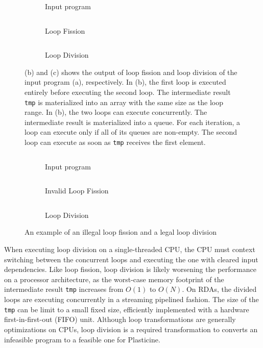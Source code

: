 \begin{figure}
\centering
\begin{subfigure}[b]{0.28\textwidth}
\inputminted{python}{code/loopexp1.py}
\caption{Input program}
\end{subfigure}
\hfill
\begin{subfigure}[b]{0.31\textwidth}
\inputminted{python}{code/loopexp1fission.py}
\caption{Loop Fission}
\end{subfigure}
\hfill
\begin{subfigure}[b]{0.32\textwidth}
\inputminted{python}{code/loopexp1division.py}
\caption{Loop Division}
\end{subfigure}
\caption[Loop fission vs. loop division]{
  (b) and (c) shows the output of loop fission and loop division of the input program (a), respectively.
  In (b), the first loop is executed entirely before executing the second loop. The intermediate
  result \texttt{tmp} is materialized into an array with the same size as the loop range.
  In (b), the two loops can execute concurrently. The intermediate result is materialized into a
  queue. For each iteration, a loop can execute only if all of its queues are non-empty.
  The second loop can execute as soon as \texttt{tmp} receives the first element.
}
\label{fig:loopexp1}
\centering
\begin{subfigure}[b]{0.28\textwidth}
\inputminted{python}{code/loopexp2.py}
\caption{Input program}
\end{subfigure}
\hfill
\begin{subfigure}[b]{0.32\textwidth}
\inputminted{python}{code/loopexp2fission.py}
\caption{Invalid Loop Fission}
\end{subfigure}
\hfill
\begin{subfigure}[b]{0.31\textwidth}
\inputminted{python}{code/loopexp2division.py}
\caption{Loop Division}
\end{subfigure}
\caption[An example of an illegal loop fission and a valid loop division]{
An example of an illegal loop fission and a legal loop division
}
\label{fig:loopexp2}
\end{figure}

When executing loop division on a single-threaded CPU, the CPU must context switching between the
concurrent loops
and executing the one with cleared input dependencies.
Like loop fission, loop division is likely worsening the performance on a processor architecture, as
the worst-case memory footprint of the intermediate result \texttt{tmp} increases from $O(1)$ to $O(N)$.
On RDAs, the divided loops are executing
concurrently in a streaming pipelined fashion. The size of the \texttt{tmp} can be limit to a small fixed
size, efficiently implemented with a hardware first-in-first-out (FIFO) unit. 
Although loop transformations are generally optimizations on CPUs,
loop division is a required transformation to converts an infeasible program to a feasible one for Plasticine.

